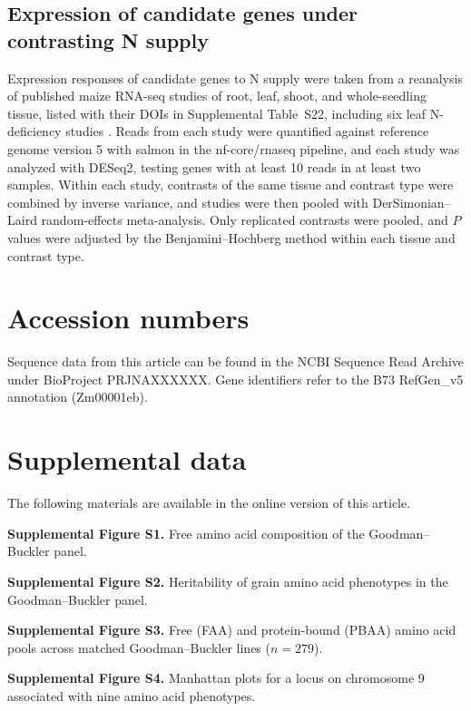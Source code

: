 \documentclass[namedate,unnumsec,webpdf,contemporary,large]{oup-authoring-template}
\begin{document}
\subsection{Expression of candidate genes under contrasting N supply}
Expression responses of candidate genes to N supply were taken from a reanalysis of published maize RNA-seq studies of root, leaf, shoot, and whole-seedling tissue, listed with their DOIs in Supplemental Table~S22, including six leaf N-deficiency studies \citep{Mu2017LN, Guo2022LN, Ma2021LN, TorresRodriguez2021LN, AlonsoNieves2022LN, Wang2025NRT25}. Reads from each study were quantified against reference genome version 5 with salmon in the nf-core/rnaseq pipeline, and each study was analyzed with DESeq2, testing genes with at least 10 reads in at least two samples. Within each study, contrasts of the same tissue and contrast type were combined by inverse variance, and studies were then pooled with DerSimonian--Laird random-effects meta-analysis. Only replicated contrasts were pooled, and $P$ values were adjusted by the Benjamini--Hochberg method within each tissue and contrast type.

\section{Accession numbers}
Sequence data from this article can be found in the NCBI Sequence Read Archive under BioProject PRJNAXXXXXX. Gene identifiers refer to the B73 RefGen\_v5 annotation (Zm00001eb).

\section{Supplemental data}
The following materials are available in the online version of this article.

\textbf{Supplemental Figure S1.} Free amino acid composition of the Goodman--Buckler panel.

\textbf{Supplemental Figure S2.} Heritability of grain amino acid phenotypes in the Goodman--Buckler panel.

\textbf{Supplemental Figure S3.} Free (FAA) and protein-bound (PBAA) amino acid pools across matched Goodman--Buckler lines ($n = 279$).

\textbf{Supplemental Figure S4.} Manhattan plots for a locus on chromosome 9 associated with nine amino acid phenotypes.
\end{document}
